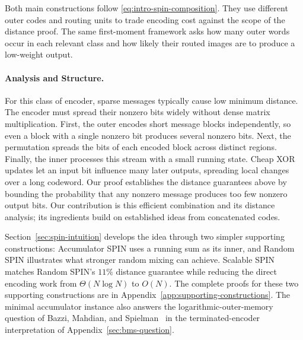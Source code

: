 Both main constructions follow \eqref{eq:intro-spin-composition}. They use
different outer codes and routing units to trade encoding cost against
the scope of the distance proof. The same first-moment
framework asks how many outer words occur in each relevant class and how
likely their routed images are to produce a low-weight output.

\paragraph{Analysis and Structure.}
For this class of encoder, sparse messages typically cause low minimum
distance. The encoder must spread their nonzero bits widely without dense
matrix multiplication.
First, the outer encodes short message blocks independently, so even a block
with a single nonzero bit produces several nonzero bits.
Next, the permutation spreads the bits of each encoded block across distinct
regions.
Finally, the inner processes this stream with a small running state.
Cheap XOR updates let an input bit influence many later outputs, spreading
local changes over a long codeword.
Our proof establishes the distance guarantees above by
bounding the probability that any nonzero message produces too few nonzero
output bits. Our contribution is this efficient combination and its distance
analysis; its ingredients build on established ideas from concatenated codes.

Section~\ref{sec:spin-intuition} develops the idea through two simpler
supporting constructions: Accumulator SPIN uses a running sum as its inner, and Random SPIN
illustrates what stronger random mixing can achieve. Scalable SPIN
matches Random SPIN's $11\%$ distance guarantee while reducing the direct
encoding work from $\Theta(N\log N)$ to $O(N)$.
The complete proofs for these two supporting constructions are in
Appendix~\ref{app:supporting-constructions}.
The minimal accumulator instance also answers the logarithmic-outer-memory
question of Bazzi, Mahdian, and Spielman~\cite{bms09} in the
terminated-encoder interpretation of Appendix~\ref{sec:bms-question}.

